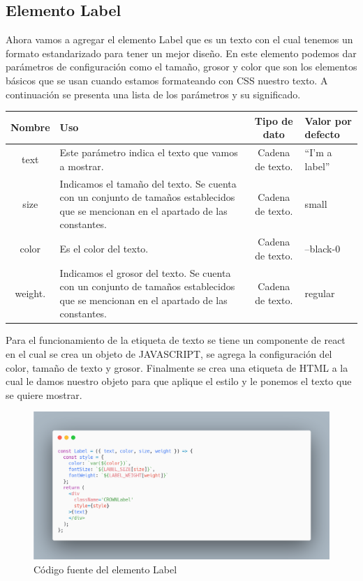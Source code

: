\subsection{Elemento Label}
Ahora vamos a agregar el elemento Label que es un texto con el cual tenemos un formato estandarizado para tener un mejor diseño. En este elemento podemos dar parámetros de configuración como el tamaño, grosor y color que son los elementos básicos que se usan cuando estamos formateando con CSS nuestro texto. 
A continuación se presenta una lista de los parámetros y  su significado.
\newline
\begin{center}
 \begin{tabular}{ | c |  p{5cm}  | c | p{3cm} |} 
 \hline
 \textbf{Nombre} &  \textbf{Uso} &  \textbf{ Tipo de dato} &  \textbf{Valor por defecto}\\ [0.5ex] 
 \hline\hline
text 		& Este parámetro  indica el texto que vamos a mostrar.  &  Cadena de texto. 	& “I’m a label” \\  [2.5ex] 
 \hline
size 	        & Indicamos el tamaño del texto. Se cuenta con un conjunto de tamaños establecidos que se mencionan en el apartado de las constantes.       & Cadena de texto.  	& small \\[2.5ex] 
 \hline
color        & Es el color del texto.						    & Cadena de texto. 	& --black-0 \\[3.5ex] 
 \hline
 weight.   & Indicamos el grosor del texto. Se cuenta con un conjunto de tamaños establecidos que se mencionan en el apartado de las constantes.&  Cadena de texto. 	& regular \\[2.5ex] 
 \hline
\end{tabular}
\end{center}
\newline
\newline
Para el funcionamiento de la etiqueta de texto se tiene un componente de react en el cual se crea un objeto de JAVASCRIPT, se agrega la configuración del color, tamaño de texto y grosor. Finalmente se crea una etiqueta de HTML a la cual le damos nuestro objeto para que aplique el estilo y le ponemos el texto que se quiere mostrar.
\newline
\newline
\begin{figure}[H]
    \includegraphics[width=1\textwidth]{./Imagenes/carbon-11.png}
    \caption[Código fuente del elemento Label]{Código fuente del elemento Label}
    \end{figure}
